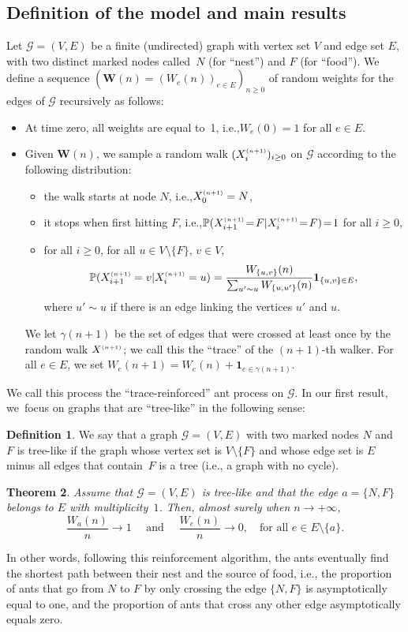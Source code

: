 \documentclass[11pt]{article}
\newcommand{\ie}{i.e.,\xspace}
\let\mathcal\mathscr
\newcommand{\bW}{\boldsymbol{W}}
\numberwithin{equation}{section}
\newtheorem{theorem}{Theorem}[section]
\theoremstyle{definition}
\newtheorem{definition}[theorem]{Definition}
\let\bs\boldsymbol
\newcommand{\sss}{\ensuremath{\scriptscriptstyle}}
\begin{document}
\subsection{Definition of the model and main results}
Let $\mathcal G\!=\!(V,E)$ be a \hbox{finite} (undirected) graph with vertex set $V$ and edge set $E$,
with two distinct marked nodes called~$N$ (for ``nest'') and $F$ (for ``food'').
We define a sequence $(\bW(n)\!=\!(W_e(n))_{e\in E})_{n\geq 0}$ of random weights for the edges of $\mathcal G$ recursively as follows:
\begin{itemize}
\item At time zero, all weights are equal to~1, \ie $W_e(0) = 1$ for all $e\in E$.
\item Given $\bW(n)$, we sample a random walk $(X^{\sss (n+1)}_i)_{i\geq 0}$
on $\mathcal G$ according to the following distribution:
\begin{itemize}
\item the walk starts at node $N$, \ie $X_0^{\sss (n+1)} = N$,
\item it stops when first hitting $F$, \ie $\mathbb P(X^{\sss (n+1)}_{i+1}\!=\!F | X^{\sss (n+1)}_{i}\!=\!F)\!=\!1$ for all $i\!\geq\!0$,
\item for all $i\geq 0$, for all {$u\in V\setminus\{F\}$}, $v\in V$,
\[
\mathbb P(X^{\sss (n+1)}_{i+1} = v | X^{\sss (n+1)}_{i}=u) = \frac{W_{\{u,v\}}(n)}{\sum_{u'\sim u}W_{\{u,u'\}}(n)} \bs 1_{\{u,v\}\in E},
\]
where $u'\sim u$ if there is an edge linking the vertices $u'$ and $u$.
\end{itemize}
We let $\gamma(n+1)$ be the set of edges that were crossed at least once
by the random walk $X^{\sss (n+1)}$; we call this the ``trace'' of the $(n+1)$-th walker.
For all $e\in E$, we set $W_e(n+1) = W_e(n)+\bs 1_{e\in \gamma(n+1)}$.
\end{itemize}

We call this process the ``trace-reinforced'' ant process on $\mathcal G$. In our first result, we~focus on graphs that are ``tree-like'' in the following sense:

\begin{definition}
We say that a graph $\mathcal G = (V,E)$ with two marked nodes $N$ and~$F$
is tree-like if the graph whose vertex set is $V\setminus \{F\}$
and whose edge set is $E$ minus all edges that contain~$F$ is a tree (\ie a graph with no cycle).
\end{definition}

\begin{theorem}\label{th:main}
Assume that $\mathcal G = (V,E)$ is tree-like and that the edge $a=\{N,F\}$ belongs to $E$ with multiplicity~$1$.
Then, almost surely when $n\to+\infty$,
\[
\frac{W_a(n)}{n} \to 1
\quad\text{ and }\quad
\frac{W_e(n)}{n} \to 0,\quad \text{for all } e\in E\setminus\{a\}.
\]
\end{theorem}
In other words, following this reinforcement algorithm, the ants eventually find the shortest path between their nest and the source of food, \ie the proportion of ants that go from $N$ to $F$ by only crossing the edge $\{N,F\}$ is asymptotically equal to one, and the proportion of ants that cross any other edge asymptotically equals zero.
\end{document}
